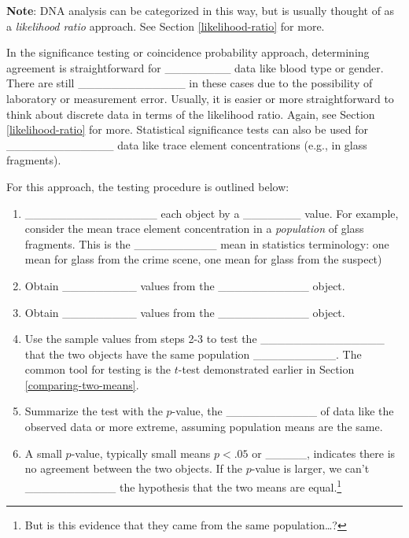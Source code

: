 \documentclass[]{book}
\providecommand{\tightlist}{%
  \setlength{\itemsep}{0pt}\setlength{\parskip}{0pt}}
\let\rmarkdownfootnote\footnote%
\def\footnote{\protect\rmarkdownfootnote}
\theoremstyle{definition}
\theoremstyle{definition}
\theoremstyle{remark}
\begin{document}
\textbf{Note}: DNA analysis can be categorized in this way, but is
usually thought of as a \emph{likelihood ratio} approach. See Section
\ref{likelihood-ratio} for more.

In the significance testing or coincidence probability approach,
determining agreement is straightforward for \_\_\_\_\_\_\_\_ data like
blood type or gender. There are still \_\_\_\_\_\_\_\_\_\_\_\_\_ in
these cases due to the possibility of laboratory or measurement error.
Usually, it is easier or more straightforward to think about discrete
data in terms of the likelihood ratio. Again, see Section
\ref{likelihood-ratio} for more. Statistical significance tests can also
be used for \_\_\_\_\_\_\_\_\_\_\_\_\_ data like trace element
concentrations (e.g., in glass fragments).

For this approach, the testing procedure is outlined below:
\vspace{.1in}

\begin{enumerate}
\def\labelenumi{\arabic{enumi}.}
\tightlist
\item
  \_\_\_\_\_\_\_\_\_\_\_\_\_\_\_\_ each object by a \_\_\_\_\_\_\_
  value. For example, consider the mean trace element concentration in a
  \emph{population} of glass fragments. This is the \_\_\_\_\_\_\_\_\_\_
  mean in statistics terminology: one mean for glass from the crime
  scene, one mean for glass from the suspect) \vspace{.1in}
\item
  Obtain \_\_\_\_\_\_\_\_\_ values from the \_\_\_\_\_\_\_\_\_\_\_
  object. \vspace{.1in}
\item
  Obtain \_\_\_\_\_\_\_\_\_ values from the \_\_\_\_\_\_\_\_\_\_\_
  object. \vspace{.1in}
\item
  Use the sample values from steps 2-3 to test the
  \_\_\_\_\_\_\_\_\_\_\_\_\_\_\_ that the two objects have the same
  population \_\_\_\_\_\_\_\_\_\_. The common tool for testing is the
  \(t\)-test demonstrated earlier in Section \ref{comparing-two-means}.
  \vspace{.1in}
\item
  Summarize the test with the \(p\)-value, the \_\_\_\_\_\_\_\_\_\_\_ of
  data like the observed data or more extreme, assuming population means
  are the same. \vspace{.1in}
\item
  A small \(p\)-value, typically small means \(p < .05\) or \_\_\_\_\_,
  indicates there is no agreement between the two objects. If the
  \(p\)-value is larger, we can't \_\_\_\_\_\_\_\_\_\_\_ the hypothesis
  that the two means are equal.\footnote{But is this evidence that they
    came from the same population\ldots{}?}
\end{enumerate}
\end{document}
